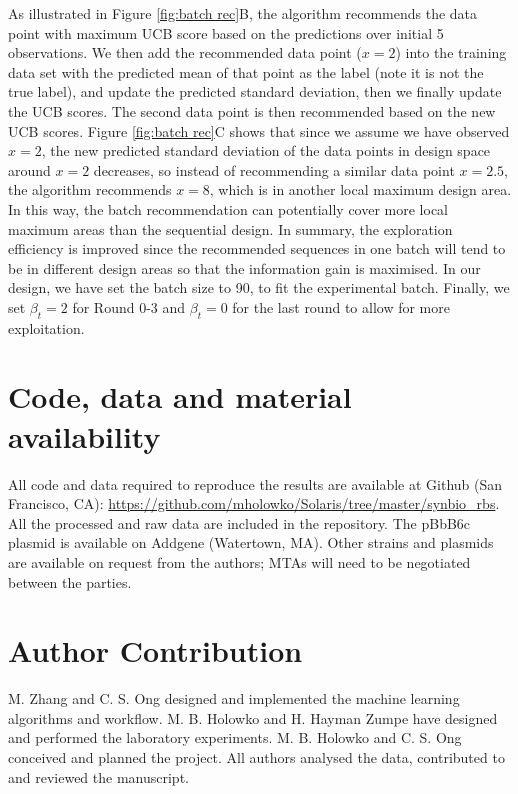 \documentclass{scrartcl}[2013/05/29]%
\begin{document}
As illustrated in Figure \ref{fig:batch rec}B, the algorithm recommends the data point with maximum UCB score based on the predictions over initial 5 observations.  
We then add the recommended data point ($x = 2$) into the training data set with the predicted mean of that point as the label (note it is not the true label), and update the predicted standard deviation, then we finally update the UCB scores. 
The second data point is then recommended based on the new UCB scores.   
Figure \ref{fig:batch rec}C shows that since we assume we have observed $x = 2$, the new predicted standard deviation of the data points in design space around $x =2$  decreases, so instead of recommending a similar data point $x = 2.5$, the algorithm recommends $x = 8$, which is in another local maximum design area. 
In this way, the batch recommendation can potentially cover more local maximum areas than the sequential design. 
In summary, the exploration efficiency is improved since the recommended sequences in one batch will tend to be in different design areas so that the information gain is maximised. 
In our design, we have set the batch size to 90, to fit the experimental batch.
Finally, we set $\beta_t = 2$ for Round 0-3 and $\beta_t = 0$ for the last round to allow for more exploitation.


\section*{Code, data and material availability}

All code and data required to reproduce the results are available at Github (San Francisco, CA): \url{https://github.com/mholowko/Solaris/tree/master/synbio_rbs}.
All the processed and raw data are included in the repository.
The pBbB6c plasmid is available on Addgene (Watertown, MA). Other strains and plasmids are available on request from the authors; MTAs will need to be negotiated between the parties.


\section*{Author Contribution}
M. Zhang and C. S. Ong  designed and implemented the machine learning algorithms and workflow. M. B. Holowko and H. Hayman Zumpe have designed and performed the laboratory experiments. M. B. Holowko and C. S. Ong conceived and planned the project. All authors analysed the data, contributed to and reviewed the manuscript.
\end{document}
